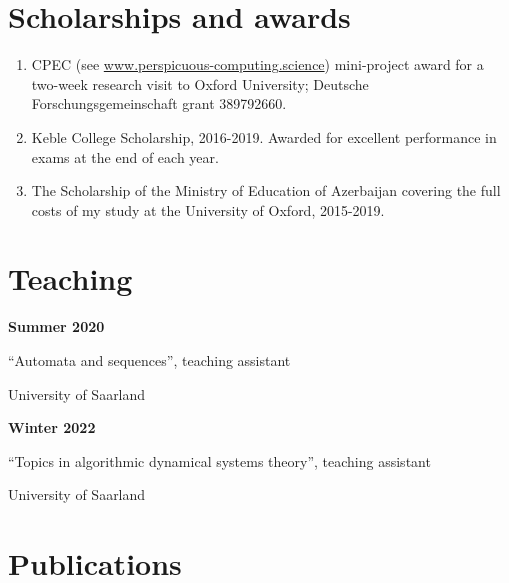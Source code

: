 \documentclass{article}
\begin{document}
	\section*{Scholarships and awards}
	\begin{enumerate}
		\item CPEC (see \url{www.perspicuous-computing.science}) mini-project award for a two-week research visit to Oxford University; Deutsche Forschungsgemeinschaft grant 389792660.
		\item Keble College Scholarship, 2016-2019. Awarded for excellent performance in exams at the end of each year.
		\item The Scholarship of the Ministry of Education of Azerbaijan covering the full costs of my study at the University of Oxford, 2015-2019.
	\end{enumerate}
	
	\section*{Teaching}
	\noindent\begin{minipage}{0.3\textwidth}
		\hspace{0.5cm} \textbf{Summer 2020}
	\end{minipage}
	\begin{minipage}{0.7\textwidth}
		``Automata and sequences'', teaching assistant 
		
		University of Saarland
	\end{minipage}
	
	\vspace{0.3cm}
	
	\noindent\begin{minipage}{0.3\textwidth}
		\hspace{0.5cm} \textbf{Winter 2022}
	\end{minipage}
	\begin{minipage}{0.7\textwidth}
		``Topics in algorithmic dynamical systems theory'', teaching assistant 
		
		University of Saarland
	\end{minipage}

        \section*{Publications}
\end{document}
